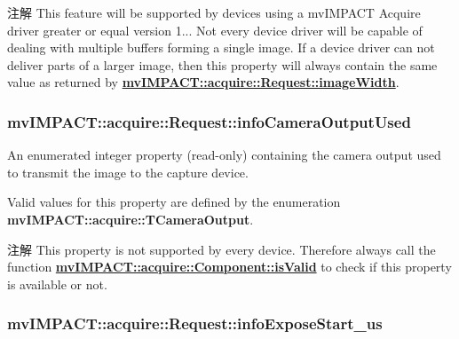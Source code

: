 \begin{DoxyNote}{注解}
This feature will be supported by devices using a mv\+I\+M\+P\+A\+C\+T Acquire driver greater or equal version 1... Not every device driver will be capable of dealing with multiple buffers forming a single image. If a device driver can not deliver parts of a larger image, then this property will always contain the same value as returned by {\bfseries \hyperlink{classmv_i_m_p_a_c_t_1_1acquire_1_1_request_a3b55253e7d176517fd60ddae724f974c}{mv\+I\+M\+P\+A\+C\+T\+::acquire\+::\+Request\+::image\+Width}}. 
\end{DoxyNote}
\hypertarget{classmv_i_m_p_a_c_t_1_1acquire_1_1_request_a531770aef701671337f6a75f6d08aa09}{
\subsubsection[{info\+Camera\+Output\+Used}]{ mv\+I\+M\+P\+A\+C\+T\+::acquire\+::\+Request\+::info\+Camera\+Output\+Used}}\label{classmv_i_m_p_a_c_t_1_1acquire_1_1_request_a531770aef701671337f6a75f6d08aa09}


An enumerated integer property {\bfseries }(read-\/only) containing the camera output used to transmit the image to the capture device. 

Valid values for this property are defined by the enumeration {\bfseries mv\+I\+M\+P\+A\+C\+T\+::acquire\+::\+T\+Camera\+Output}.

\begin{DoxyNote}{注解}
This property is not supported by every device. Therefore always call the function {\bfseries \hyperlink{classmv_i_m_p_a_c_t_1_1acquire_1_1_component_ac51e55e7e046101f3c6119d84123abd5}{mv\+I\+M\+P\+A\+C\+T\+::acquire\+::\+Component\+::is\+Valid}} to check if this property is available or not. 
\end{DoxyNote}
\hypertarget{classmv_i_m_p_a_c_t_1_1acquire_1_1_request_ac54da8206db5d5175d1c4c25baf0b134}{
\subsubsection[{info\+Expose\+Start\+\_\+us}]{ mv\+I\+M\+P\+A\+C\+T\+::acquire\+::\+Request\+::info\+Expose\+Start\+\_\+us}}\label{classmv_i_m_p_a_c_t_1_1acquire_1_1_request_ac54da8206db5d5175d1c4c25baf0b134}


